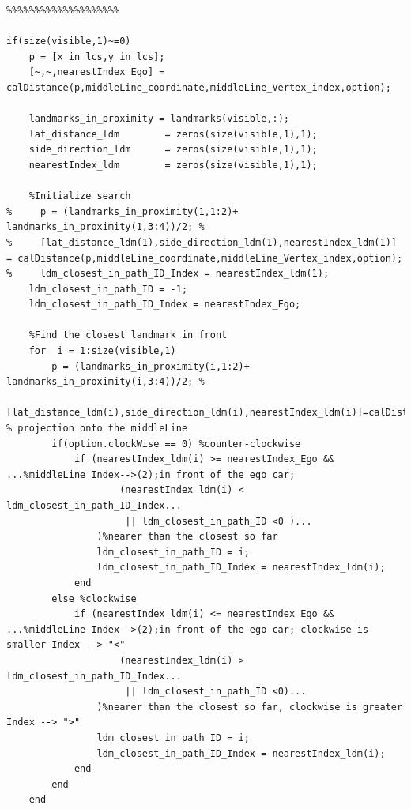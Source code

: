 \documentclass[12pt,a4paper]{article}
\begin{document}
{{{\begin{verbatim}
%%%%%%%%%%%%%%%%%%%%

if(size(visible,1)~=0)
    p = [x_in_lcs,y_in_lcs];
    [~,~,nearestIndex_Ego] = calDistance(p,middleLine_coordinate,middleLine_Vertex_index,option);

    landmarks_in_proximity = landmarks(visible,:);
    lat_distance_ldm        = zeros(size(visible,1),1);
    side_direction_ldm      = zeros(size(visible,1),1);
    nearestIndex_ldm        = zeros(size(visible,1),1);

    %Initialize search
%     p = (landmarks_in_proximity(1,1:2)+ landmarks_in_proximity(1,3:4))/2; %
%     [lat_distance_ldm(1),side_direction_ldm(1),nearestIndex_ldm(1)] = calDistance(p,middleLine_coordinate,middleLine_Vertex_index,option);
%     ldm_closest_in_path_ID_Index = nearestIndex_ldm(1);
    ldm_closest_in_path_ID = -1;
    ldm_closest_in_path_ID_Index = nearestIndex_Ego;

    %Find the closest landmark in front
    for  i = 1:size(visible,1)
        p = (landmarks_in_proximity(i,1:2)+ landmarks_in_proximity(i,3:4))/2; %
        [lat_distance_ldm(i),side_direction_ldm(i),nearestIndex_ldm(i)]=calDistance(p,middleLine_coordinate,middleLine_Vertex_index,option); % projection onto the middleLine
        if(option.clockWise == 0) %counter-clockwise
            if (nearestIndex_ldm(i) >= nearestIndex_Ego && ...%middleLine Index-->(2);in front of the ego car;
                    (nearestIndex_ldm(i) < ldm_closest_in_path_ID_Index...
                     || ldm_closest_in_path_ID <0 )...
                )%nearer than the closest so far
                ldm_closest_in_path_ID = i;
                ldm_closest_in_path_ID_Index = nearestIndex_ldm(i);
            end
        else %clockwise
            if (nearestIndex_ldm(i) <= nearestIndex_Ego && ...%middleLine Index-->(2);in front of the ego car; clockwise is smaller Index --> "<"
                    (nearestIndex_ldm(i) > ldm_closest_in_path_ID_Index...
                     || ldm_closest_in_path_ID <0)...
                )%nearer than the closest so far, clockwise is greater Index --> ">"
                ldm_closest_in_path_ID = i;
                ldm_closest_in_path_ID_Index = nearestIndex_ldm(i);
            end
        end
    end


\end{verbatim}}}}
\end{document}
